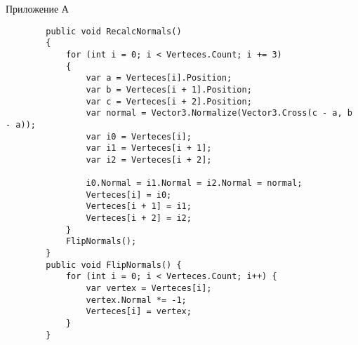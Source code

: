 \clearpage
\Large{Приложение А}
\begin{verbatim}
        public void RecalcNormals()
        {
            for (int i = 0; i < Verteces.Count; i += 3)
            {
                var a = Verteces[i].Position;
                var b = Verteces[i + 1].Position;
                var c = Verteces[i + 2].Position;
                var normal = Vector3.Normalize(Vector3.Cross(c - a, b - a));
                var i0 = Verteces[i];
                var i1 = Verteces[i + 1];
                var i2 = Verteces[i + 2];

                i0.Normal = i1.Normal = i2.Normal = normal;
                Verteces[i] = i0;
                Verteces[i + 1] = i1;
                Verteces[i + 2] = i2;
            }
            FlipNormals();
        }
        public void FlipNormals() {
            for (int i = 0; i < Verteces.Count; i++) {
                var vertex = Verteces[i];
                vertex.Normal *= -1;
                Verteces[i] = vertex;
            }
        }
\end{verbatim}